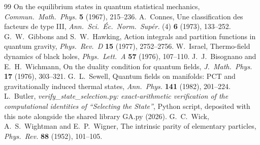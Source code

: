 \documentclass[11pt]{article}
\theoremstyle{definition}
\theoremstyle{plain}
\begin{document}
\begin{thebibliography}{99}
On the equilibrium states in quantum statistical mechanics,
\emph{Commun.\ Math.\ Phys.} \textbf{5} (1967), 215--236.
 A.~Connes,
Une classification des facteurs de type III,
\emph{Ann.\ Sci.\ \'Ec.\ Norm.\ Sup\'er.} (4) \textbf{6} (1973), 133--252.
 G.~W.~Gibbons and S.~W.~Hawking,
Action integrals and partition functions in quantum gravity,
\emph{Phys.\ Rev.\ D} \textbf{15} (1977), 2752--2756.
 W.~Israel,
Thermo-field dynamics of black holes,
\emph{Phys.\ Lett.\ A} \textbf{57} (1976), 107--110.
 J.~J.~Bisognano and E.~H.~Wichmann,
On the duality condition for quantum fields,
\emph{J.\ Math.\ Phys.} \textbf{17} (1976), 303--321.
 G.~L.~Sewell,
Quantum fields on manifolds: PCT and gravitationally induced thermal states,
\emph{Ann.\ Phys.} \textbf{141} (1982), 201--224.
 L.~Butler,
\emph{verify\_state\_selection.py: exact-arithmetic verification of the computational identities of ``Selecting the State''},
Python script, deposited with this note alongside the shared library GA.py (2026).
 G.~C.~Wick, A.~S.~Wightman and E.~P.~Wigner,
The intrinsic parity of elementary particles,
\emph{Phys.\ Rev.} \textbf{88} (1952), 101--105.
\end{thebibliography}
\end{document}
